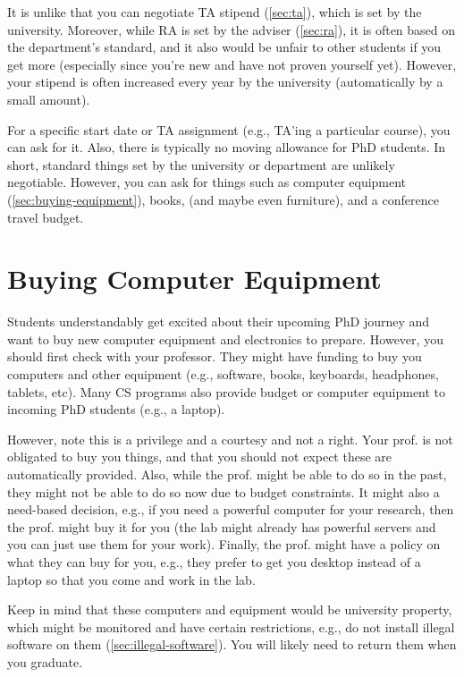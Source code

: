 \documentclass[oneside,11pt,dvipsnames]{book}
\def\sectioninfo#1{%
  \addcontentsline{toc}{sectioninfo}{%
    \noexpand\numberline{}\color{black}{#1}}%
}
\begin{document}
It is unlike that you can negotiate TA stipend (\autoref{sec:ta}), which is set by the university. Moreover, while RA is set by the adviser (\autoref{sec:ra}), it is often based on the department's standard, and it also would be unfair to other students if you get more (especially since you're new and have not proven yourself yet). However, your stipend is often increased every year by the university (automatically by a small amount).

For a specific start date or TA assignment (e.g., TA'ing a particular course), you can ask for it. Also, there is typically no moving allowance for PhD students. In short, standard things set by the university or department are unlikely negotiable.  However, you can ask for things such as computer equipment (\autoref{sec:buying-equipment}), books, (and maybe even furniture), and a conference travel budget.


\section{Buying Computer Equipment}\label{sec:buying-equipment}
\sectioninfo{Ask your prof. if they can buy computer equipment and such for your research.}

Students understandably get excited about their upcoming PhD journey and want to buy new computer equipment and electronics to prepare. However, you should first check with your professor.  They might have funding to buy you computers and other equipment (e.g., software, books, keyboards, headphones, tablets, etc). Many CS programs also provide budget or computer equipment to incoming PhD students (e.g., a laptop). 

However, note this is a privilege and a courtesy and not a right.  Your prof. is not obligated to buy you things, and that you should not expect these are automatically provided.  Also, while the prof. might be able to do so in the past, they might not be able to do so now due to budget constraints.  It might also a need-based decision, e.g., if you need a powerful computer for your research, then the prof. might buy it for you (the lab might already has powerful servers and you can just use them for your work). Finally, the prof. might have a policy on what they can buy for you, e.g., they prefer to get you desktop instead of a laptop so that you come and work in the lab.

Keep in mind that these computers and equipment would be university property, which might be monitored and have certain restrictions, e.g., do not install illegal software on them (\autoref{sec:illegal-software}).  You will likely need to return them when you graduate. 
\end{document}
